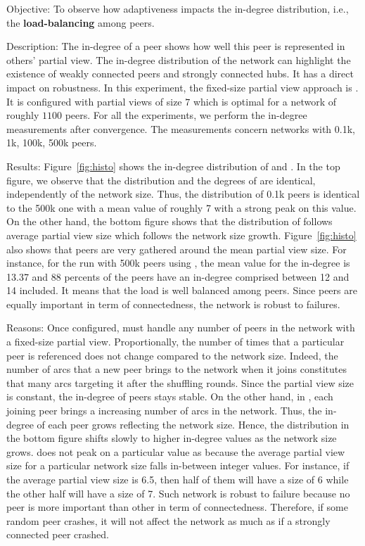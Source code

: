 \begin{asparadesc}
\item[Objective:] To observe how adaptiveness impacts the in-degree
  distribution, i.e., the \textbf{load-balancing} among peers.
\item[Description:] The in-degree of a peer shows how well this peer is
  represented in others' partial view. The in-degree distribution of the
  network can highlight the existence of weakly connected peers and strongly
  connected hubs. It has a direct impact on robustness. In this experiment, the
  fixed-size partial view approach is \CYCLON{}. It is configured with partial
  views of size $7$ which is optimal for a network of roughly $1100$ peers.
  For all the experiments, we perform the in-degree measurements after
  convergence. The measurements concern networks with 0.1k, 1k, 100k, 500k
  peers.
\item[Results:] Figure~\ref{fig:histo} shows the in-degree distribution of
  \CYCLON and \SPRAY. In the top figure, we observe that the distribution and
  the degrees of \CYCLON are identical, independently of the network
  size. Thus, the distribution of 0.1k peers is identical to the 500k one with
  a mean value of roughly 7 with a strong peak on this value. On the other
  hand, the bottom figure shows that the distribution of \SPRAY follows average
  partial view size which follows the network size
  growth. Figure~\ref{fig:histo} also shows that peers are very gathered around
  the mean partial view size. For instance, for the run with 500k peers using
  \SPRAY, the mean value for the in-degree is 13.37 and 88 percents of the
  peers have an in-degree comprised between 12 and 14 included. It means that
  the load is well balanced among peers. Since peers are equally important in
  term of connectedness, the network is robust to failures.
\item[Reasons:] Once configured, \CYCLON must handle any number of peers in the
  network with a fixed-size partial view. Proportionally, the number of times
  that a particular peer is referenced does not change compared to the network
  size. Indeed, the number of arcs that a new peer brings to the network when it
  joins constitutes that many arcs targeting it after the shuffling
  rounds. Since the partial view size is constant, the in-degree of peers stays
  stable. On the other hand, in \SPRAY, each joining peer brings a increasing
  number of arcs in the network. Thus, the in-degree of each peer grows
  reflecting the network size. Hence, the distribution in the bottom figure
  shifts slowly to higher in-degree values as the network size grows.  \SPRAY
  does not peak on a particular value as \CYCLON because the average partial
  view size for a particular network size falls in-between integer values. For
  instance, if the average partial view size is 6.5, then half of them will
  have a size of 6 while the other half will have a size of 7. Such network is
  robust to failure because no peer is more important than other in term of
  connectedness. Therefore, if some random peer crashes, it will not affect
  the network as much as if a strongly connected peer crashed.
\end{asparadesc}

